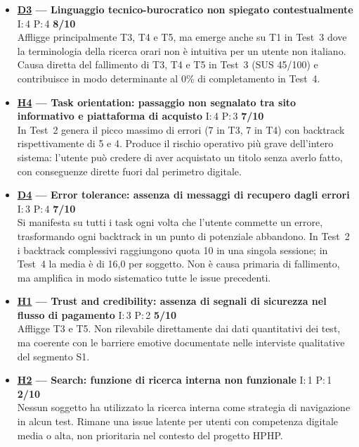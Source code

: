﻿\documentclass[11pt,a4paper]{article}
\begin{document}
\begin{tcolorbox}[base]
\begin{itemize}[leftmargin=*,itemsep=8pt]
    \item \textbf{\hyperref[iss:D3]{D3} --- Linguaggio tecnico-burocratico 
    non spiegato contestualmente}
    \hfill I:\,4 \textbar{} P:\,4 \textbar{} \textbf{8/10}\\
    Affligge principalmente T3, T4 e T5, ma emerge anche su T1 in Test~3 
    dove la terminologia della ricerca orari non è intuitiva per un utente 
    non italiano. Causa diretta del fallimento di T3, T4 e T5 in Test~3 
    (SUS 45/100) e contribuisce in modo determinante al 0\% di 
    completamento in Test~4.

    \item \textbf{\hyperref[iss:H4]{H4} --- Task orientation:
    passaggio non segnalato tra sito informativo e piattaforma
    di acquisto}
    \hfill I:\,4 \textbar{} P:\,3 \textbar{} \textbf{7/10}\\
    In Test~2 genera il picco massimo di errori 
    (7 in T3, 7 in T4) con backtrack rispettivamente di 5 e 4. 
    Produce il rischio operativo più grave dell'intero sistema: 
    l'utente può credere di aver acquistato un titolo senza averlo 
    fatto, con conseguenze dirette fuori dal perimetro digitale.

    \item \textbf{\hyperref[iss:D4]{D4} --- Error tolerance: 
    assenza di messaggi di recupero dagli errori}
    \hfill I:\,3 \textbar{} P:\,4 \textbar{} \textbf{7/10}\\
    Si manifesta su tutti i task ogni volta che l'utente commette un 
    errore, trasformando ogni backtrack in un punto di potenziale 
    abbandono. In Test~2 i backtrack complessivi raggiungono quota 10 
    in una singola sessione; in Test~4 la media è di 16,0 per soggetto. 
    Non è causa primaria di fallimento, ma amplifica in modo sistematico 
    tutte le issue precedenti.

    \item \textbf{\hyperref[iss:H1]{H1} --- Trust and credibility: 
    assenza di segnali di sicurezza nel flusso di pagamento}
    \hfill I:\,3 \textbar{} P:\,2 \textbar{} \textbf{5/10}\\
    Affligge T3 e T5. Non rilevabile direttamente dai dati quantitativi 
    dei test, ma coerente con le barriere emotive documentate nelle 
    interviste qualitative del segmento S1.

    \item \textbf{\hyperref[iss:H2]{H2} --- Search: 
    funzione di ricerca interna non funzionale}
    \hfill I:\,1 \textbar{} P:\,1 \textbar{} \textbf{2/10}\\
    Nessun soggetto ha utilizzato la ricerca interna come strategia 
    di navigazione in alcun test. Rimane una issue latente per utenti 
    con competenza digitale media o alta, non prioritaria nel contesto 
    del progetto HPHP.

\end{itemize}
\end{tcolorbox}
\end{document}
